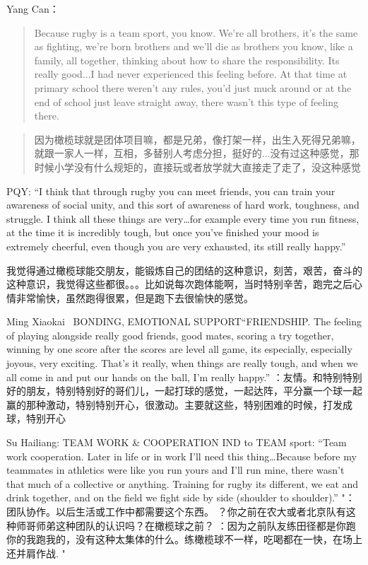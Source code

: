 \begin{CJK}{UTF8}{gbsn}
      Yang Can：
      \begin{quotation}
        Because rugby is a team sport, you know. We’re all brothers, it's the same as fighting, we’re born brothers and we’ll die as brothers you know, like a family, all together, thinking about how to share the responsibility. Its really good...I had never experienced this feeling before.  At that time at primary school there weren’t any rules, you’d just muck around or at the end of school just leave straight away, there wasn’t this type of feeling there.
      \end{quotation}


      \begin{quotation}
        因为橄榄球就是团体项目嘛，都是兄弟，像打架一样，出生入死得兄弟嘛，就跟一家人一样，互相，多替别人考虑分担，挺好的...没有过这种感觉，那时候小学没有什么规矩的，直接玩或者放学就大直接走了走了，没这种感觉
      \end{quotation}





        PQY:
        ``I think that through rugby you can meet friends, you can train your awareness of social unity, and this sort of awareness of hard work, toughness, and struggle. I think all these things are very…for example every time you run fitness, at the time it is incredibly tough, but once you’ve finished your mood is extremely cheerful, even though you are very exhausted, its still really happy.''

        我觉得通过橄榄球能交朋友，能锻炼自己的团结的这种意识，刻苦，艰苦，奋斗的这种意识，我觉得这些都很。。。比如说每次跑体能啊，当时特别辛苦，跑完之后心情非常愉快，虽然跑得很累，但是跑下去很愉快的感觉。 


        Ming Xiaokai
         BONDING, EMOTIONAL SUPPORT“FRIENDSHIP.  The feeling of playing alongside really good friends, good mates, scoring a try together, winning by one score after the scores are level all game, its especially, especially joyous, very exciting.  That's it really, when things are really tough, and when we all come in and put our hands on the ball, I’m really happy.”	：友情。和特别特别好的朋友，特别特别好的哥们儿，一起打球的感觉，一起达阵，平分赢一个球一起赢的那种激动，特别特别开心，很激动。主要就这些，特别困难的时候，打发成球，特别开心 

        Su Hailiang:
        TEAM WORK & COOPERATION IND to TEAM sport: “Team work cooperation. Later in life or in work I’ll need this thing…Because before my teammates in athletics were like you run yours and I’ll run mine, there wasn’t that much of a collective or anything. Training for rugby its different, we eat and drink together, and on the field we fight side by side (shoulder to shoulder).”	"：团队协作。以后生活或工作中都需要这个东西。
        ？你之前在农大或者北京队有这种师哥师弟这种团队的认识吗？在橄榄球之前？
        ：因为之前队友练田径都是你跑你的我跑我的，没有这种太集体的什么。练橄榄球不一样，吃喝都在一快，在场上还并肩作战.
        "


\end{CJK}
